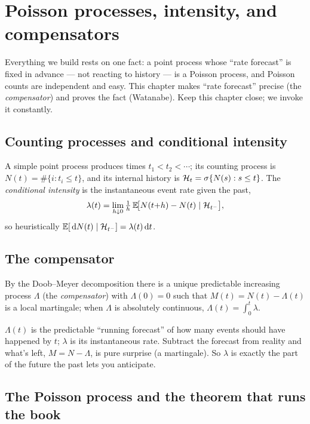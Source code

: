 \chapter{Poisson processes, intensity, and compensators}
\label{ch:poisson}

\begin{motivation}
Everything we build rests on one fact: a point process whose ``rate forecast'' is
fixed in advance --- not reacting to history --- is a Poisson process, and Poisson
counts are independent and easy. This chapter makes ``rate forecast'' precise
(the \emph{compensator}) and proves the fact (Watanabe). Keep this chapter close;
we invoke it constantly.
\end{motivation}

\section{Counting processes and conditional intensity}

A simple point process produces times $t_1<t_2<\cdots$; its counting process is
$N(t)=\#\{i:t_i\le t\}$, and its internal history is
$\mathcal{H}_t=\sigma\{N(s):s\le t\}$. The \emph{conditional intensity} is the
instantaneous event rate given the past,
\begin{equation}
\lambda(t)=\lim_{h\downarrow0}\tfrac1h\,\mathbb{E}\!\big[N(t{+}h)-N(t)\mid\mathcal{H}_{t^-}\big],
\end{equation}
so heuristically $\mathbb{E}[\,\mathrm{d} N(t)\mid\mathcal{H}_{t^-}]=\lambda(t)\,\mathrm{d} t$.

\section{The compensator}

By the Doob--Meyer decomposition there is a unique predictable increasing process
$\Lambda$ (the \emph{compensator}) with $\Lambda(0)=0$ such that
$M(t)=N(t)-\Lambda(t)$ is a local martingale; when $\Lambda$ is absolutely
continuous, $\Lambda(t)=\int_0^t\lambda$.

\begin{intuitionbox}
$\Lambda(t)$ is the predictable ``running forecast'' of how many events should have
happened by $t$; $\lambda$ is its instantaneous rate. Subtract the forecast from
reality and what's left, $M=N-\Lambda$, is pure surprise (a martingale). So
$\lambda$ is exactly the part of the future the past lets you anticipate.
\end{intuitionbox}

\section{The Poisson process and the theorem that runs the book}

